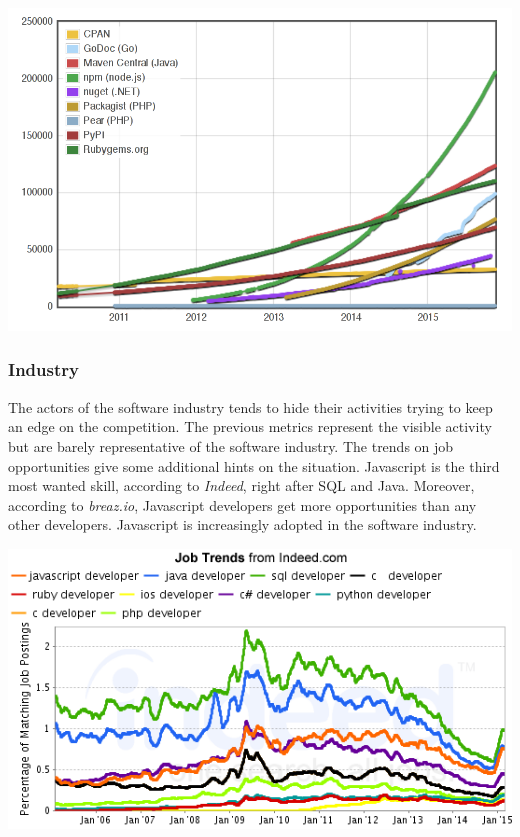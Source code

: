 

\includegraphics[width=0.9\linewidth]{../../data/js-trends/modulecounts}

\subsubsection{Industry}

The actors of the software industry tends to hide their activities trying to keep an edge on the competition.
The previous metrics represent the visible activity but are barely representative of the software industry.
The trends on job opportunities give some additional hints on the situation.
Javascript is the third most wanted skill, according to \textit{Indeed}, right after SQL and Java.
Moreover, according to \textit{breaz.io}, Javascript developers get more opportunities than any other developers.
Javascript is increasingly adopted in the software industry.

\includegraphics[width=0.9\linewidth]{../../data/js-trends/jobgraph}

